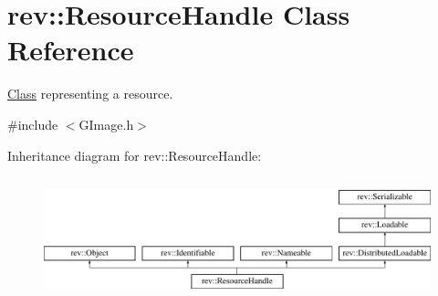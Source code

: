 \hypertarget{classrev_1_1_resource_handle}{}\section{rev\+::Resource\+Handle Class Reference}
\label{classrev_1_1_resource_handle}


\mbox{\hyperlink{struct_class}{Class}} representing a resource.  




{\ttfamily \#include $<$G\+Image.\+h$>$}

Inheritance diagram for rev\+::Resource\+Handle\+:\begin{figure}[H]
\begin{center}
\leavevmode
\includegraphics[height=3.566879cm]{classrev_1_1_resource_handle}
\end{center}
\end{figure}
